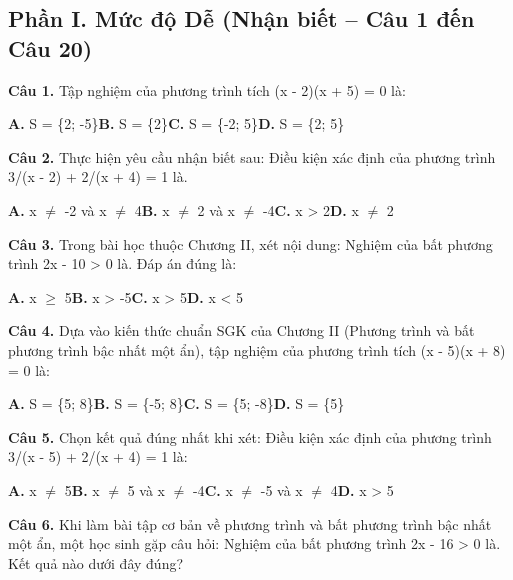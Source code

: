 \documentclass[11pt,a4paper]{article}
\begin{document}
\subsection*{\color{accent} Phần I. Mức độ Dễ (Nhận biết -- Câu 1 đến Câu 20)}
\textbf{\color{primary} Câu 1.} Tập nghiệm của phương trình tích (x - 2)(x + 5) = 0 là:\par
\hspace*{1.5em}\textbf{A.} S = \{2; -5\}\quad\quad \textbf{B.} S = \{2\}\quad\quad \textbf{C.} S = \{-2; 5\}\quad\quad \textbf{D.} S = \{2; 5\}\par\vspace{2pt}
\textbf{\color{primary} Câu 2.} Thực hiện yêu cầu nhận biết sau: Điều kiện xác định của phương trình 3/(x - 2) + 2/(x + 4) = 1 là.\par
\hspace*{1.5em}\textbf{A.} x $\ne$ -2 và x $\ne$ 4\quad\quad \textbf{B.} x $\ne$ 2 và x $\ne$ -4\quad\quad \textbf{C.} x > 2\quad\quad \textbf{D.} x $\ne$ 2\par\vspace{2pt}
\textbf{\color{primary} Câu 3.} Trong bài học thuộc Chương II, xét nội dung: Nghiệm của bất phương trình 2x - 10 > 0 là. Đáp án đúng là:\par
\hspace*{1.5em}\textbf{A.} x $\ge$ 5\quad\quad \textbf{B.} x > -5\quad\quad \textbf{C.} x > 5\quad\quad \textbf{D.} x < 5\par\vspace{2pt}
\textbf{\color{primary} Câu 4.} Dựa vào kiến thức chuẩn SGK của Chương II (Phương trình và bất phương trình bậc nhất một ẩn), tập nghiệm của phương trình tích (x - 5)(x + 8) = 0 là:\par
\hspace*{1.5em}\textbf{A.} S = \{5; 8\}\quad\quad \textbf{B.} S = \{-5; 8\}\quad\quad \textbf{C.} S = \{5; -8\}\quad\quad \textbf{D.} S = \{5\}\par\vspace{2pt}
\textbf{\color{primary} Câu 5.} Chọn kết quả đúng nhất khi xét: Điều kiện xác định của phương trình 3/(x - 5) + 2/(x + 4) = 1 là:\par
\hspace*{1.5em}\textbf{A.} x $\ne$ 5\quad\quad \textbf{B.} x $\ne$ 5 và x $\ne$ -4\quad\quad \textbf{C.} x $\ne$ -5 và x $\ne$ 4\quad\quad \textbf{D.} x > 5\par\vspace{2pt}
\textbf{\color{primary} Câu 6.} Khi làm bài tập cơ bản về phương trình và bất phương trình bậc nhất một ẩn, một học sinh gặp câu hỏi: Nghiệm của bất phương trình 2x - 16 > 0 là. Kết quả nào dưới đây đúng?\par
\end{document}
